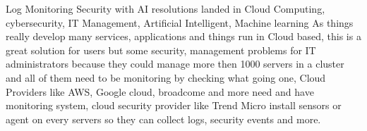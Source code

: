 Log Monitoring Security with AI resolutions  landed in Cloud Computing, cybersecurity, IT Management, Artificial Intelligent, Machine learning As things really develop many services, applications and things run in Cloud based, this is a great solution for users but some security, management problems for IT administrators because they could manage more then 1000 servers in a cluster and all of them need to be monitoring by checking what going one, Cloud Providers like AWS, Google cloud, broadcome and more need and have monitoring system, cloud security provider like Trend Micro install sensors or agent on every servers so they can collect logs, security events and more.






